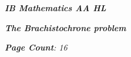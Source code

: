 

\begin{titlepage}
    \begin{center}
        \vspace*{1cm}
            
        \date{}
            
        \huge
            
        \textit{\textbf{IB Mathematics AA HL}}
            
        \vspace{0.25cm}
            
            
        \vspace{2.5cm}
            
		\vspace{0.25cm}
            
        \vspace{2.5cm}
            
        \LARGE
            

		\textit{\textbf{The Brachistochrone problem}}
            
        \vspace{2.5cm}
            
        \Large
            
        \vspace{0.25cm}
        

		\vspace{6cm}

		\vspace{1cm}            
            
		\Large		
		        
		\vspace{0.25cm} 
		
		\textit{\textbf{Page Count}: 16}
		
		   
            
        \vspace{2cm}
            
        \Large
         
		\vspace{0.25cm}         
            
            
        \vspace{0.25cm}
            
           
            
    \end{center}
\end{titlepage}



